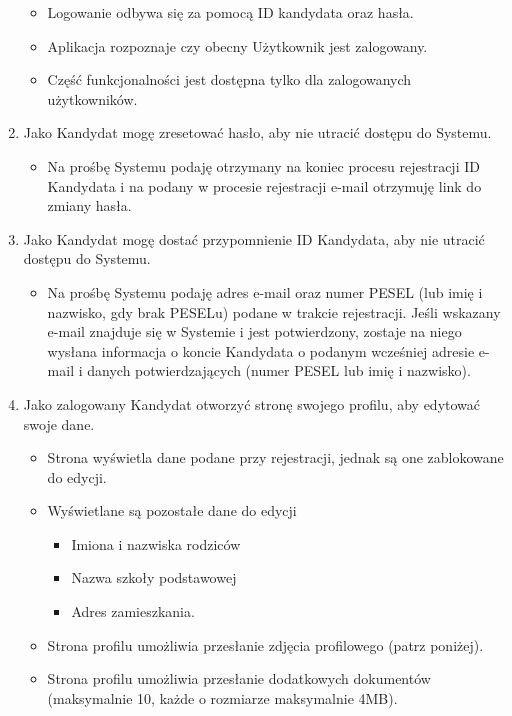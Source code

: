 \documentclass{article}
\begin{document}
\begin{enumerate}
        \begin{itemize}
            \item Logowanie odbywa się za pomocą ID kandydata oraz hasła.
            \item Aplikacja rozpoznaje czy obecny Użytkownik jest zalogowany.
            \item Część funkcjonalności jest dostępna tylko dla zalogowanych użytkowników.
        \end{itemize}
    \item Jako Kandydat mogę zresetować hasło, aby nie utracić dostępu do Systemu. 
        \begin{itemize}
            \item Na prośbę Systemu podaję otrzymany na koniec procesu rejestracji ID Kandydata i na podany w procesie rejestracji e-mail otrzymuję link do zmiany hasła.
        \end{itemize}
    \item Jako Kandydat mogę dostać przypomnienie ID Kandydata, aby nie utracić dostępu do Systemu. 
        \begin{itemize}
            \item Na prośbę Systemu podaję adres e-mail oraz numer PESEL (lub imię i nazwisko, gdy brak PESELu) podane w trakcie rejestracji. Jeśli wskazany e-mail znajduje się w Systemie i jest potwierdzony, zostaje na niego wysłana informacja o koncie Kandydata o podanym wcześniej adresie e-mail i danych potwierdzających (numer PESEL lub imię i nazwisko).
        \end{itemize}
    \item Jako zalogowany Kandydat otworzyć stronę swojego profilu, aby edytować swoje dane.   
        \begin{itemize}
            \item Strona wyświetla dane podane przy rejestracji, jednak są one zablokowane do edycji.
            \item Wyświetlane są pozostałe dane do edycji
                \begin{itemize}
                    \item Imiona i nazwiska rodziców
                    \item Nazwa szkoły podstawowej
                    \item Adres zamieszkania.
                \end{itemize}
            \item Strona profilu umożliwia przesłanie zdjęcia profilowego (patrz poniżej).
            \item Strona profilu umożliwia przesłanie dodatkowych dokumentów (maksymalnie 10, każde o rozmiarze maksymalnie 4MB).

\end{itemize}
\end{enumerate}
\end{document}
